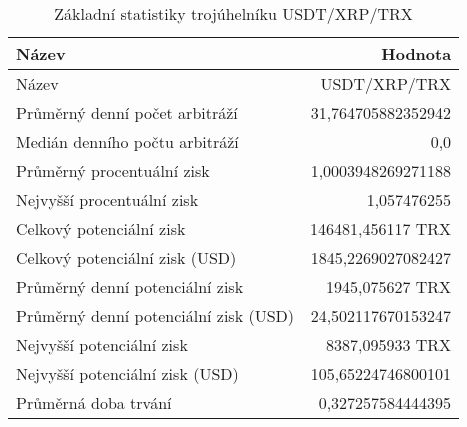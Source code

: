 \begin{table}\centering
\caption{Základní statistiky trojúhelníku USDT/XRP/TRX}
\label{USDTXRPTRX_stats}
\begin{tabular}{|| l | r ||}
\hline Název & Hodnota \\ 
\hline\hline Název & USDT/XRP/TRX \\ 
\hline Průměrný denní počet arbitráží & 31,764705882352942 \\ 
\hline Medián denního počtu arbitráží & 0,0 \\ 
\hline Průměrný procentuální zisk & 1,0003948269271188 \\ 
\hline Nejvyšší procentuální zisk & 1,057476255 \\ 
\hline Celkový potenciální zisk & 146481,456117 TRX \\ 
\hline Celkový potenciální zisk (USD) & 1845,2269027082427 \\ 
\hline Průměrný denní potenciální zisk & 1945,075627 TRX \\ 
\hline Průměrný denní potenciální zisk (USD) & 24,502117670153247 \\ 
\hline Nejvyšší potenciální zisk & 8387,095933 TRX \\ 
\hline Nejvyšší potenciální zisk (USD) & 105,65224746800101 \\ 
\hline Průměrná doba trvání & 0,327257584444395 \\ 
\hline
\end{tabular}
\end{table}